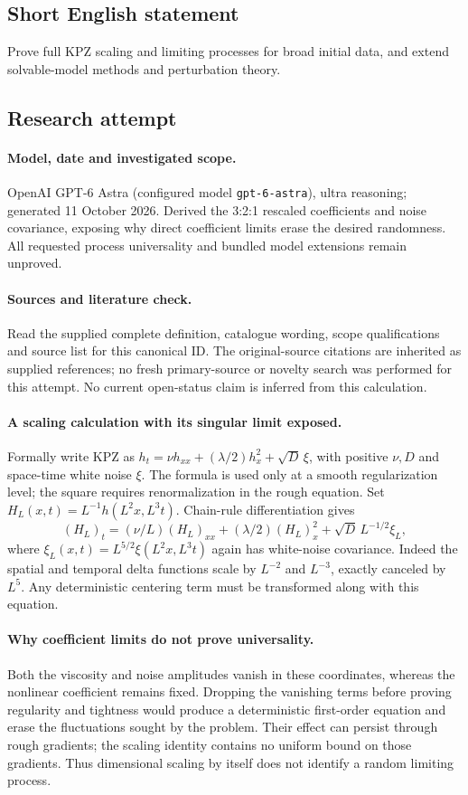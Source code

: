 \documentclass[11pt]{article}
\begin{document}
\subsection{Short English statement}
Prove full KPZ scaling and limiting processes for broad initial data, and extend solvable-model methods and perturbation theory.
\subsection{Research attempt}
\paragraph{Model, date and investigated scope.}
OpenAI GPT-6 Astra (configured model \texttt{gpt-6-astra}), ultra reasoning; generated 11 October 2026. Derived the 3:2:1 rescaled coefficients and noise covariance, exposing why direct coefficient limits erase the desired randomness. All requested process universality and bundled model extensions remain unproved.

\paragraph{Sources and literature check.}
Read the supplied complete definition, catalogue wording, scope qualifications and source list for this canonical ID. The original-source citations are inherited as supplied references; no fresh primary-source or novelty search was performed for this attempt. No current open-status claim is inferred from this calculation.

\paragraph{A scaling calculation with its singular limit exposed.}Formally write KPZ as \(h_t=\nu h_{xx}+(\lambda/2)h_x^2+\sqrt D\,\xi\), with positive \(\nu,D\) and space-time white noise \(\xi\). The formula is used only at a smooth regularization level; the square requires renormalization in the rough equation. Set \(H_L(x,t)=L^{-1}h(L^2x,L^3t)\). Chain-rule differentiation gives
\[(H_L)_t=(\nu/L)(H_L)_{xx}+(\lambda/2)(H_L)_x^2+\sqrt D\,L^{-1/2}\xi_L,
\]
where \(\xi_L(x,t)=L^{5/2}\xi(L^2x,L^3t)\) again has white-noise covariance. Indeed the spatial and temporal delta functions scale by \(L^{-2}\) and \(L^{-3}\), exactly canceled by \(L^5\). Any deterministic centering term must be transformed along with this equation.
\paragraph{Why coefficient limits do not prove universality.}Both the viscosity and noise amplitudes vanish in these coordinates, whereas the nonlinear coefficient remains fixed. Dropping the vanishing terms before proving regularity and tightness would produce a deterministic first-order equation and erase the fluctuations sought by the problem. Their effect can persist through rough gradients; the scaling identity contains no uniform bound on those gradients. Thus dimensional scaling by itself does not identify a random limiting process.
\end{document}
